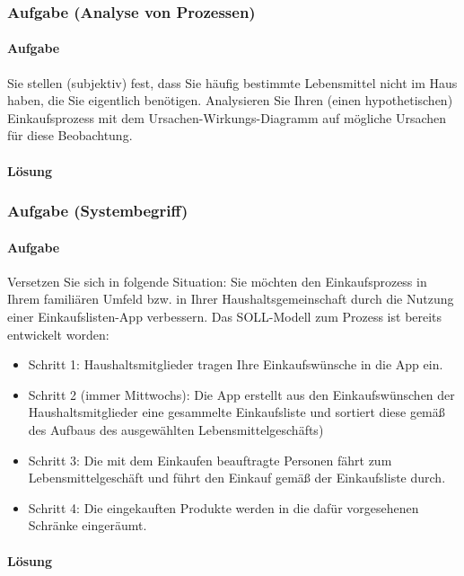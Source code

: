 \subsubsection*{Aufgabe (Analyse von Prozessen)}
\paragraph*{Aufgabe}
    Sie stellen (subjektiv) fest, dass Sie häufig bestimmte Lebensmittel nicht im Haus haben, die Sie eigentlich benötigen. Analysieren Sie Ihren (einen hypothetischen) Einkaufsprozess mit dem Ursachen-Wirkungs-Diagramm auf mögliche Ursachen für diese Beobachtung.
\paragraph*{Lösung}


\subsubsection*{Aufgabe (Systembegriff)}
\paragraph*{Aufgabe}
    Versetzen Sie sich in folgende Situation: Sie möchten den Einkaufsprozess in Ihrem familiären Umfeld bzw. in Ihrer Haushaltsgemeinschaft durch die Nutzung einer Einkaufslisten-App verbessern. Das SOLL-Modell zum Prozess ist bereits entwickelt worden:
   
    \begin{itemize}
        \item Schritt 1: Haushaltsmitglieder tragen Ihre Einkaufswünsche in die App ein.
        \item Schritt 2 (immer Mittwochs): Die App erstellt aus den Einkaufswünschen der Haushaltsmitglieder eine gesammelte Einkaufsliste und sortiert diese gemäß des Aufbaus des ausgewählten Lebensmittelgeschäfts)
        \item Schritt 3: Die mit dem Einkaufen beauftragte Personen fährt zum Lebensmittelgeschäft und führt den Einkauf gemäß der Einkaufsliste durch.
        \item Schritt 4: Die eingekauften Produkte werden in die dafür vorgesehenen Schränke eingeräumt.
    \end{itemize}
\paragraph*{Lösung}

